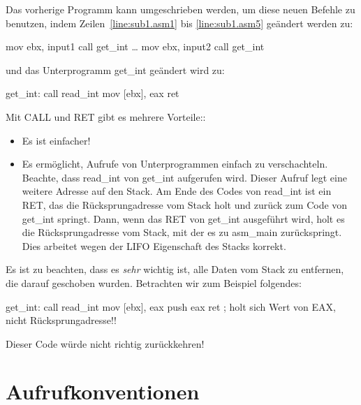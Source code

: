 Das vorherige Programm kann umgeschrieben werden, um diese neuen
Befehle zu benutzen, indem Zeilen~\ref{line:sub1.asm1} bis
\ref{line:sub1.asm5} ge\"{a}ndert werden zu:
\begin{AsmCodeListing}[numbers=none, commandchars=\\\{\}]
      mov    ebx, input1
      call   get_int
      \ldots
      mov    ebx, input2
      call   get_int
\end{AsmCodeListing}
und das Unterprogramm {\code get\_int} ge\"{a}ndert wird zu:
\begin{AsmCodeListing}[numbers=none]
 get_int:
      call   read_int
      mov    [ebx], eax
      ret
\end{AsmCodeListing}

Mit {\code CALL} und {\code RET} gibt es mehrere Vorteile::
\begin{itemize}
\parskip=-0.10em %

\item
Es ist einfacher!

\item
Es erm\"{o}glicht, Aufrufe von Unterprogrammen einfach zu verschachteln.
Beachte, dass {\code read\_int} von {\code get\_int} aufgerufen
wird. Dieser Aufruf legt eine weitere Adresse auf den Stack. Am Ende
des Codes von {\code read\_int} ist ein RET, das die
R\"{u}cksprungadresse vom Stack holt und zur\"{u}ck zum Code von {\code
get\_int} springt. Dann, wenn das RET von {\code get\_int}
ausgef\"{u}hrt wird, holt es die R\"{u}cksprungadresse vom Stack, mit der es
zu {\code asm\_main} zur\"{u}ckspringt. Dies arbeitet wegen der LIFO
Eigenschaft des Stacks korrekt.
\end{itemize}

Es ist zu beachten, dass es \emph{sehr} wichtig ist, alle Daten vom
Stack zu entfernen, die darauf geschoben wurden. Betrachten wir zum
Beispiel folgendes:
\begin{AsmCodeListing}[frame=none, numbers=none, commandchars=\\\{\}]
 get_int:
      call   read_int
      mov    [ebx], eax
      push   eax
      ret                   ; holt sich Wert von EAX, nicht R\"{u}cksprungadresse!!
\end{AsmCodeListing}
Dieser Code w\"{u}rde nicht richtig zur\"{u}ckkehren!
 

\section{Aufrufkonventionen}

